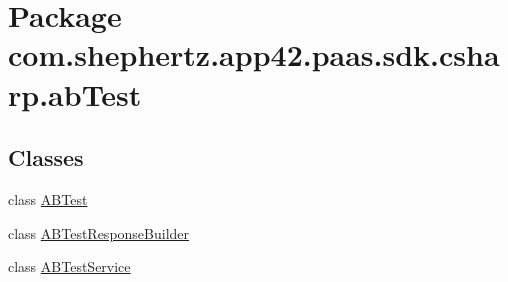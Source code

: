 \hypertarget{namespacecom_1_1shephertz_1_1app42_1_1paas_1_1sdk_1_1csharp_1_1ab_test}{\section{Package com.\+shephertz.\+app42.\+paas.\+sdk.\+csharp.\+ab\+Test}
\label{namespacecom_1_1shephertz_1_1app42_1_1paas_1_1sdk_1_1csharp_1_1ab_test}
}
\subsection*{Classes}
\begin{DoxyCompactItemize}
\item 
class \hyperlink{classcom_1_1shephertz_1_1app42_1_1paas_1_1sdk_1_1csharp_1_1ab_test_1_1_a_b_test}{A\+B\+Test}
\item 
class \hyperlink{classcom_1_1shephertz_1_1app42_1_1paas_1_1sdk_1_1csharp_1_1ab_test_1_1_a_b_test_response_builder}{A\+B\+Test\+Response\+Builder}
\item 
class \hyperlink{classcom_1_1shephertz_1_1app42_1_1paas_1_1sdk_1_1csharp_1_1ab_test_1_1_a_b_test_service}{A\+B\+Test\+Service}
\end{DoxyCompactItemize}
